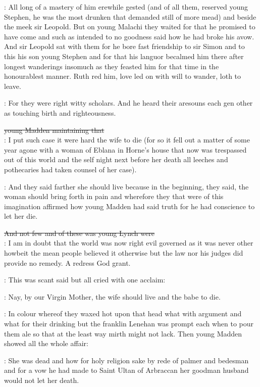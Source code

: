 :
All long of a mastery of him erewhile gested
(and of all them,
reserved young Stephen,
he was the most
drunken that demanded still of more mead) and beside the meek sir
Leopold.
But on young Malachi they waited for that he promised to
have come and such as intended to no goodness said how he had broke
his avow.
And sir Leopold sat with them for he bore fast friendship
to sir Simon and to this his son young Stephen and for that his languor
becalmed him there after longest wanderings insomuch as they feasted
him for that time in the honourablest manner.
Ruth red him,
love led
on with will to wander,
loth to leave.


:
For they were right witty scholars.
And he heard their aresouns each
gen other as touching birth and righteousness.

\sout{young Madden maintaining that}\\
\madden:
I put such case it were hard the wife to die (for so it fell out a
matter of some year agone with a woman of Eblana in Horne's house that
now was trespassed out of this world and the self night next before her
death all leeches and pothecaries had taken counsel of her case).

:
And they said farther she should live because in the beginning,
they
said,
the woman should bring forth in pain and wherefore they that were of
this imagination affirmed how young Madden had said truth for he had
conscience to let her die.

\sout{And not few and of these was young Lynch were}\\
\lynch:
I am in doubt that the world was now right evil governed as it was
never other howbeit the mean people believed it otherwise but the law nor
his judges did provide no remedy.
A redress God grant.

:
This was scant said but all cried with one acclaim:

\All:
Nay,
by our Virgin Mother,
the wife should live
and the babe to die.

:
In colour whereof they waxed hot upon that head what
with argument and what for their drinking but the franklin Lenehan was
prompt each when to pour them ale so that at the least way mirth might
not lack.
Then young Madden showed all the whole affair:

\madden:
She was dead and how for holy religion sake by rede of palmer and
bedesman and for a vow he had made to Saint Ultan of Arbraccan her
goodman husband would not let her death.

